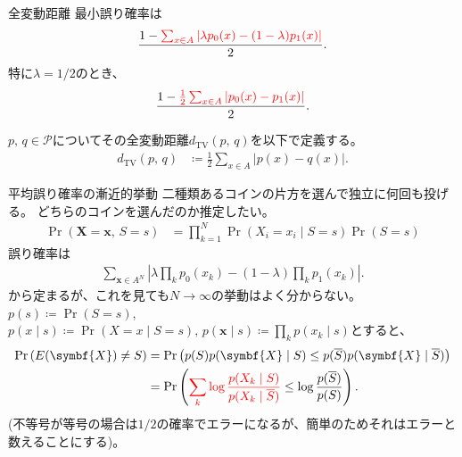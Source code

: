 \documentclass[lualatex,handout]{beamer}
\newcommand{\mycolor}[2]{%
  \begingroup
  \colorlet{currentcolor}{.}%
  \color{#1}#2%
  \color{currentcolor}%
  \endgroup
}
\newcommand{\emm}[1]{\mycolor{red}{#1}}
\newcommand\dtv{d_{\mathrm{TV}}}
\theoremstyle{definition}
\begin{document}
\begin{frame}{全変動距離}
最小誤り確率は
\begin{align*}
\frac{1-\emm{\sum_{x\in A}\left|\lambda p_0(x) - (1-\lambda) p_1(x) \right|}}2.
\end{align*}
特に$\lambda=1/2$のとき、
\begin{align*}
\frac{1-\emm{\frac12\sum_{x\in A}\left|p_0(x) - p_1(x) \right|}}2.
\end{align*}
\begin{definition}
$p,\, q\in\mathcal{P}$についてその全変動距離$\dtv(p,\,q)$を以下で定義する。
\begin{align*}
\dtv(p,\, q) &\coloneq
\frac12\sum_{x\in A}\left|p(x) - q(x) \right|.
\end{align*}
\end{definition}
\end{frame}



\begin{frame}{平均誤り確率の漸近的挙動}
\small
二種類あるコインの片方を選んで独立に何回も投げる。
どちらのコインを選んだのか推定したい。
\begin{align*}
\Pr(\symbf{X}=\symbf{x},\, S= s) &= \prod_{k=1}^N \Pr(X_i=x_i \mid S=s)\Pr(S=s)
\end{align*}
誤り確率は
\begin{align*}
\sum_{\symbf{x}\in A^N}\left|\lambda\prod_k p_0(x_k) - (1-\lambda)\prod_kp_1(x_k) \right|.
\end{align*}
から定まるが、これを見ても$N\to\infty$の挙動はよく分からない。
$p(s)\coloneq \Pr(S=s)$,
$p(x\mid s) \coloneq \Pr(X=x\mid S=s),\, p(\symbf{x}\mid s)\coloneq \prod_k p(x_k\mid s)$とすると、
\begin{align*}
\Pr\left(E(\symbf{X}) \ne S\right)
&= \Pr\left(p(S) p(\symbf{X}\mid S) \le p(\overline{S}) p(\symbf{X}\mid \overline{S})\right)\\
&= \Pr\left(\emm{\sum_k \log\frac{p(X_k\mid S)}{p(X_k\mid \overline{S})}} \le \log\frac{p(\overline{S})}{p(S)}\right).
\end{align*}
(不等号が等号の場合は$1/2$の確率でエラーになるが、簡単のためそれはエラーと数えることにする)。
\end{frame}
\end{document}

